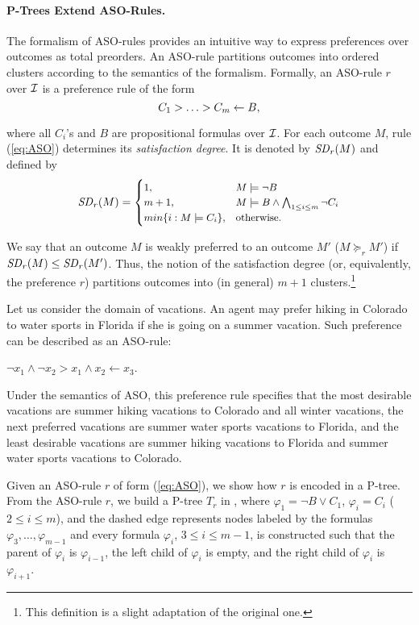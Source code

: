 \paragraph{\bf P-Trees Extend ASO-Rules.} The formalism of ASO-rules 
\cite{Brewka:ASO} provides an intuitive way to express preferences
over outcomes as total preorders.
An ASO-rule partitions outcomes into ordered clusters according to 
the semantics of the formalism.
Formally, an ASO-rule $r$ over $\mathcal{I}$ is a preference rule of the form
\begin{equation} \label{eq:ASO}
\small{C_1 > \ldots > C_m \leftarrow B,}
\end{equation}

\noindent
where all $C_i$'s and $B$ are propositional formulas over $\mathcal{I}$.
For each outcome $M$, rule (\ref{eq:ASO}) determines its \emph{satisfaction degree}.
It is denoted by $\mathit{SD}_r(M)$ and defined by
\[
\small{\mathit{SD}_r(M) =
  \begin{cases}
   1, & M \models \neg B \\
   m+1, & M \models B \wedge \bigwedge_{1 \leq i \leq m} \neg C_i \\
   min\{i:M \models C_i\}, & \mbox{otherwise}.
  \end{cases}}
\]

\noindent
We say that an outcome $M$ is weakly preferred to an 
outcome $M'$ ($M
\succeq_r M'$) if $\mathit{SD}_r(M)\leq\mathit{SD}_r(M')$. Thus, the notion of the 
satisfaction degree (or, equivalently, the preference $r$) partitions
outcomes into (in general) $m+1$ clusters.\footnote{This definition is 
a slight adaptation of the original one.}

Let us consider the domain of vacations.
An agent may prefer hiking in Colorado to water sports in Florida if she
is going on a summer vacation.
Such preference can be described as an ASO-rule:
\begin{center}
	$\neg x_1 \land \neg x_2 > x_1 \land x_2 \leftarrow x_3$.
\end{center}
Under the semantics of ASO, this preference rule specifies that
the most desirable vacations are summer hiking vacations to Colorado
and all winter vacations, the next preferred vacations are
summer water sports vacations to Florida, and the least desirable vacations
are summer hiking vacations to Florida and summer water sports vacations to Colorado.

Given an ASO-rule $r$ of form (\ref{eq:ASO}),
we show how $r$ is encoded in a P-tree.
From the ASO-rule $r$, we build a P-tree $T_r$ in ,
where $\varphi_1 = \neg B \vee C_1$,
$\varphi_i =C_i$ ($2 \leq i \leq m$),
and the dashed edge represents nodes labeled by the formulas $\varphi_3,\ldots,\varphi_{m-1}$
and every formula $\varphi_i$, $3 \leq i \leq m-1$, is constructed such that
the parent of $\varphi_i$ is $\varphi_{i-1}$, the left child of $\varphi_i$
is empty, and the right child of $\varphi_i$ is $\varphi_{i+1}$.

